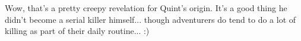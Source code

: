 Wow, that's a pretty creepy revelation for Quint's origin. It's a good thing he didn't become a serial killer himself... though adventurers do tend to do a lot of killing as part of their daily routine... :)\\

